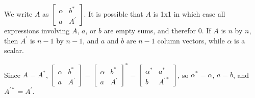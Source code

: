\documentclass{article}
\begin{document}
We write \begin{math}{}A\end{math} as \begin{math}{}\begin{bmatrix}\alpha & b^* \\ a & A^{'}\end{bmatrix}\end{math}. It is possible
that \begin{math}{}A\end{math} is 1x1 in which case all expressions involving
\begin{math}{}A\end{math},
\begin{math}{}a\end{math}, or
\begin{math}{}b\end{math} are empty sums, and therefor 0. If 
\begin{math}{}A\end{math} is 
\begin{math}{}n\end{math} by
\begin{math}{}n\end{math}, then 
\begin{math}{}A^{'}\end{math} is 
\begin{math}{}n-1\end{math} by
\begin{math}{}n-1\end{math}, and
\begin{math}{}a\end{math} and
\begin{math}{}b\end{math} are 
\begin{math}{}n-1\end{math} column vectors, while
\begin{math}{}\alpha\end{math} is a scalar.

Since \begin{math}{}A=A^*\end{math}, 
 \begin{math}{}
\begin{bmatrix}\alpha & b^* \\ a & A^{'}\end{bmatrix} = 
\begin{bmatrix}\alpha & b^* \\ a & A^{'}\end{bmatrix}^* = 
\begin{bmatrix}\alpha^* & a^* \\ b & A^{'*}\end{bmatrix} \end{math}, so 
\begin{math}{}\alpha^*=\alpha\end{math}, \begin{math}{}a=b\end{math}, and
\begin{math}{}A^{'*} = A^{'}\end{math}.
\end{document}

